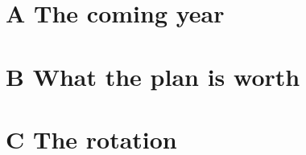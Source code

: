 


\maketitle
\vspace{-1.2em}

\section*{A \quad The coming year}



\section*{B \quad What the plan is worth}






\section*{C \quad The rotation}





